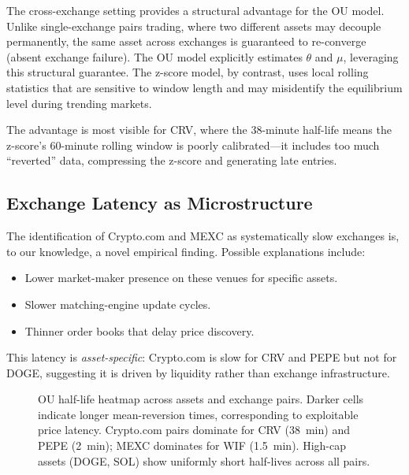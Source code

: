 \documentclass[sigconf,nonacm=false]{acmart}
\begin{document}
The cross-exchange setting provides a structural advantage for the OU model. Unlike single-exchange pairs trading, where two different assets may decouple permanently, the same asset across exchanges is guaranteed to re-converge (absent exchange failure). The OU model explicitly estimates $\theta$ and $\mu$, leveraging this structural guarantee. The z-score model, by contrast, uses local rolling statistics that are sensitive to window length and may misidentify the equilibrium level during trending markets.

The advantage is most visible for CRV, where the 38-minute half-life means the z-score's 60-minute rolling window is poorly calibrated---it includes too much ``reverted'' data, compressing the z-score and generating late entries.

\subsection{Exchange Latency as Microstructure}

The identification of Crypto.com and MEXC as systematically slow exchanges is, to our knowledge, a novel empirical finding. Possible explanations include:
\begin{itemize}
    \item Lower market-maker presence on these venues for specific assets.
    \item Slower matching-engine update cycles.
    \item Thinner order books that delay price discovery.
\end{itemize}

This latency is \emph{asset-specific}: Crypto.com is slow for CRV and PEPE but not for DOGE, suggesting it is driven by liquidity rather than exchange infrastructure.

\begin{figure}[h]
\centering
{}
\caption{OU half-life heatmap across assets and exchange pairs. Darker cells indicate longer mean-reversion times, corresponding to exploitable price latency. Crypto.com pairs dominate for CRV (38~min) and PEPE (2~min); MEXC dominates for WIF (1.5~min). High-cap assets (DOGE, SOL) show uniformly short half-lives across all pairs.}
\label{fig:halflife_heatmap}
\end{figure}
\end{document}
